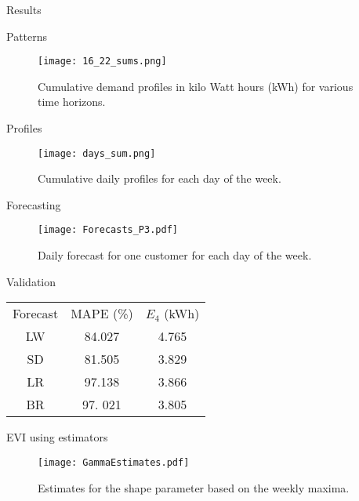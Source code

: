 \documentclass{beamer}
\begin{document}
\begin{frame}[plain,c]

\begin{center}
\Huge Results
\end{center}

\end{frame}


\begin{frame}{Patterns}
\begin{figure}
\centering
\texttt{[image: 16\_22\_sums.png]}
\caption{Cumulative demand profiles in kilo Watt hours (kWh) for various time horizons.}
\label{fig:sums} 
\end{figure}
\end{frame}

\begin{frame}{Profiles}
\begin{figure}
\centering
\texttt{[image: days\_sum.png]}
\caption{Cumulative daily profiles for each day of the week.}
\label{fig:days} 
\end{figure}
\end{frame}

\begin{frame}{Forecasting}
\begin{figure}
\centering
\texttt{[image: Forecasts\_P3.pdf]}
\caption{Daily forecast for one customer for each day of the week.}
\label{fig:days} 
\end{figure}
\end{frame}

\begin{center}
\begin{frame}{Validation}
\begin{tabular}{|c|c|c|}
\hline
Forecast & MAPE (\%) & $E_4$ (kWh) \\ 
\hhline{|=|=|=|}
LW & 84.027 & 4.765 \\
\hline
SD & 81.505 & 3.829\\
\hline
LR & 97.138 & 3.866\\
\hline
BR & 97. 021 & 3.805 \\
\hline
\end{tabular}
\end{frame}
\end{center}

\begin{frame}{EVI using estimators}
\begin{figure}
\begin{center}
\texttt{[image: GammaEstimates.pdf]}
\caption{Estimates for the shape parameter based on the weekly maxima.} \label{fig:gammaEst}
\end{center}
\end{figure}
\end{frame}
\end{document}
